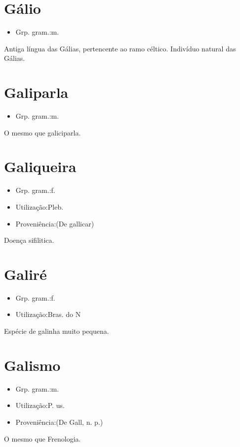 \section{Gálio}
\begin{itemize}
\item {Grp. gram.:m.}
\end{itemize}
Antiga língua das Gálias, pertencente ao ramo céltico.
Indivíduo natural das Gálias.
\section{Galiparla}
\begin{itemize}
\item {Grp. gram.:m.}
\end{itemize}
O mesmo que \textunderscore galiciparla\textunderscore .
\section{Galiqueira}
\begin{itemize}
\item {Grp. gram.:f.}
\end{itemize}
\begin{itemize}
\item {Utilização:Pleb.}
\end{itemize}
\begin{itemize}
\item {Proveniência:(De \textunderscore gallicar\textunderscore )}
\end{itemize}
Doença sifilitica.
\section{Galiré}
\begin{itemize}
\item {Grp. gram.:f.}
\end{itemize}
\begin{itemize}
\item {Utilização:Bras. do N}
\end{itemize}
Espécie de galinha muito pequena.
\section{Galismo}
\begin{itemize}
\item {Grp. gram.:m.}
\end{itemize}
\begin{itemize}
\item {Utilização:P. us.}
\end{itemize}
\begin{itemize}
\item {Proveniência:(De \textunderscore Gall\textunderscore , n. p.)}
\end{itemize}
O mesmo que \textunderscore Frenologia\textunderscore .
